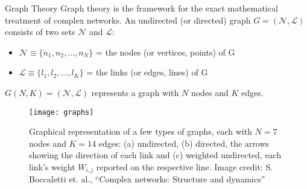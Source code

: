\begin{frame}{Graph Theory}
Graph theory is the framework for the exact mathematical treatment of complex networks. An undirected (or directed) graph $G=(\mathcal{N},\mathcal{L})$ consists of two sets $\mathcal{N}$ and $\mathcal{L}$:
\begin{itemize}
	\item $\mathcal{N} \equiv \{ n_1,n_2,...,n_N \}$ = the nodes (or vertices, points) of G
	\item $\mathcal{L} \equiv \{ l_1,l_2,...,l_K \}$ = the links (or edges, lines) of G 
\end{itemize}
$G(N,K) = (\mathcal{N},\mathcal{L})$ represents a graph with $N$ nodes and $K$ edges.\par 

\begin{figure}[!h]
  \centering
  \texttt{[image: graphs]}
  \caption{Graphical representation of a few types of graphs, each with $N=7$ nodes and $K=14$ edges: (a) undirected, (b) directed, the arrows showing the direction of each link and (c) weighted undirected, each link's weight $W_{i,j}$ reported on the respective line. Image credit: S. Boccaletti et. al., “Complex networks: Structure and dynamics”}
  \label{fig:graphs}
\end{figure}

\end{frame}

